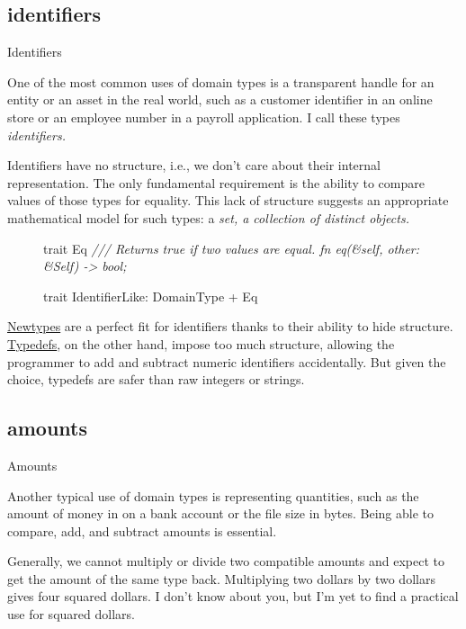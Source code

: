 \documentclass{article}
\begin{document}
\subsection{identifiers}{Identifiers}

One of the most common uses of domain types is a transparent handle for an entity or an asset in the real world, such as a customer identifier in an online store or an employee number in a payroll application.
I call these types \em{identifiers}.

Identifiers have no structure, i.e., we don't care about their internal representation.
The only fundamental requirement is the ability to compare values of those types for equality.
This lack of structure suggests an appropriate mathematical model for such types: a \em{set}, a collection of distinct objects.

\begin{figure}
\begin{code}
trait Eq {
  \em{/// Returns true if two values are equal.}
  fn eq(&self, other: &Self) -> bool;
}

trait IdentifierLike: DomainType + Eq {}
\end{code}
\end{figure}

\href{#newtypes}{Newtypes} are a perfect fit for identifiers thanks to their ability to hide structure.
\href{#typdefs}{Typedefs}, on the other hand, impose too much structure, allowing the programmer to add and subtract numeric identifiers accidentally.
But given the choice, typedefs are safer than raw integers or strings.

\subsection{amounts}{Amounts}

Another typical use of domain types is representing quantities, such as the amount of money in  on a bank account or the file size in bytes.
Being able to compare, add, and subtract amounts is essential.

Generally, we cannot multiply or divide two compatible amounts and expect to get the amount of the same type back.
Multiplying two dollars by two dollars gives four squared dollars.
I don't know about you, but I'm yet to find a practical use for squared dollars.
\end{document}
